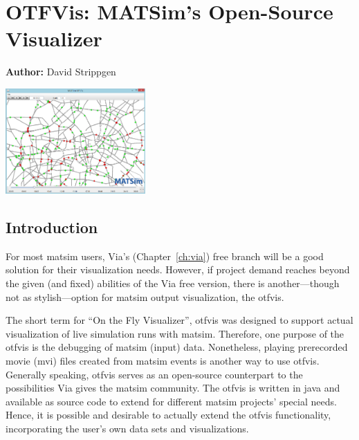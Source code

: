 \chapter{OTFVis: MATSim's Open-Source Visualizer}
\label{ch:otfvis}

\hfill \textbf{Author:} David Strippgen

\begin{center} \includegraphics[width=0.4\textwidth, angle=0]{extending/figures/otfvis/image06.png} \end{center}



\section{Introduction}
For most \gls{matsim} users, Via's (Chapter~\ref{ch:via}) free branch will be a good solution for their visualization needs. However, if project demand reaches beyond the given (and fixed) abilities of the Via free version, there is another---though not as stylish---option for \gls{matsim} output visualization, the \gls{otfvis}. 

The short term for ``On the Fly Visualizer'', \gls{otfvis} was designed to support actual visualization of live simulation runs with \gls{matsim}. Therefore, one purpose of the \gls{otfvis} is the debugging of \gls{matsim} (input) data. Nonetheless, playing prerecorded movie (\gls{mvi}) files created from \gls{matsim} events is another way to use \gls{otfvis}. Generally speaking, \gls{otfvis} serves as an open-source counterpart to the possibilities Via gives the \gls{matsim} community. The \gls{otfvis} is written in \gls{java} and available as source code to extend for different \gls{matsim} projects' special needs. Hence, it is possible and desirable to actually extend the \gls{otfvis} functionality, incorporating the user's own data sets and visualizations.

